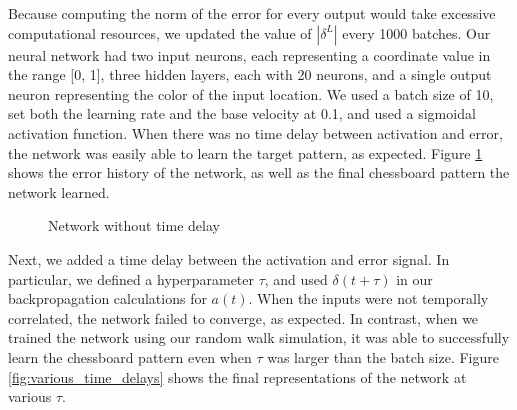 \documentclass[12pt]{article}
\begin{document}
Because computing the norm of the error for every output would take excessive computational resources, we updated the value of $|\delta^L|$ every 1000 batches. Our neural network had two input neurons, each representing a coordinate value in the range [0, 1], three hidden layers, each with 20 neurons, and a single output neuron representing the color of the input location. We used a batch size of 10, set both the learning rate and the base velocity at 0.1, and used a sigmoidal activation function. When there was no time delay between activation and error, the network was easily able to learn the target pattern, as expected. Figure \ref{fig:example} shows the error history of the network, as well as the final chessboard pattern the network learned.

\begin{figure}%
	\centering
	\qquad
	\caption{Network without time delay}%
	\label{fig:example}%
\end{figure}

Next, we added a time delay between the activation and error signal. In particular, we defined a hyperparameter $\tau$, and used $\delta(t+\tau)$ in our backpropagation calculations for $a(t)$. When the inputs were not temporally correlated, the network failed to converge, as expected. In contrast, when we trained the network using our random walk simulation, it was able to successfully learn the chessboard pattern even when $\tau$ was larger than the batch size. Figure \ref{fig:various_time_delays} shows the final representations of the network at various $\tau$.
\end{document}
